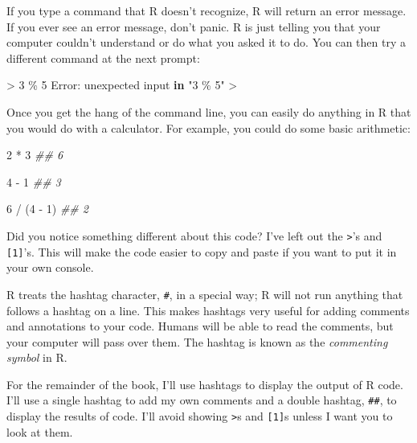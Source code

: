 \documentclass[
  letterpaper,
  DIV=11,
  numbers=noendperiod]{scrbook}
\newenvironment{Shaded}{\begin{snugshade}}{\end{snugshade}}
\newcommand{\ControlFlowTok}[1]{\textcolor[rgb]{0.00,0.23,0.31}{\textbf{#1}}}
\newcommand{\DecValTok}[1]{\textcolor[rgb]{0.68,0.00,0.00}{#1}}
\newcommand{\DocumentationTok}[1]{\textcolor[rgb]{0.37,0.37,0.37}{\textit{#1}}}
\newcommand{\NormalTok}[1]{\textcolor[rgb]{0.00,0.23,0.31}{#1}}
\newcommand{\SpecialCharTok}[1]{\textcolor[rgb]{0.37,0.37,0.37}{#1}}
\newcommand{\StringTok}[1]{\textcolor[rgb]{0.13,0.47,0.30}{#1}}
\begin{document}
If you type a command that R doesn't recognize, R will return an error
message. If you ever see an error message, don't panic. R is just
telling you that your computer couldn't understand or do what you asked
it to do. You can then try a different command at the next prompt:

\begin{Shaded}
\begin{Highlighting}[]
\SpecialCharTok{\textgreater{}} \DecValTok{3}\NormalTok{ \% }\DecValTok{5}
\NormalTok{Error}\SpecialCharTok{:}\NormalTok{ unexpected input }\ControlFlowTok{in} \StringTok{"3 \% 5"}
\SpecialCharTok{\textgreater{}}
\end{Highlighting}
\end{Shaded}

Once you get the hang of the command line, you can easily do anything in
R that you would do with a calculator. For example, you could do some
basic arithmetic:

\begin{Shaded}
\begin{Highlighting}[]
\DecValTok{2} \SpecialCharTok{*} \DecValTok{3}   
\DocumentationTok{\#\# 6}

\DecValTok{4} \SpecialCharTok{{-}} \DecValTok{1}   
\DocumentationTok{\#\# 3}

\DecValTok{6} \SpecialCharTok{/}\NormalTok{ (}\DecValTok{4} \SpecialCharTok{{-}} \DecValTok{1}\NormalTok{)   }
\DocumentationTok{\#\# 2}
\end{Highlighting}
\end{Shaded}

Did you notice something different about this code? I've left out the
\texttt{\textgreater{}}'s and \texttt{{[}1{]}}'s. This will make the
code easier to copy and paste if you want to put it in your own console.

R treats the hashtag character, \texttt{\#}, in a special way; R will
not run anything that follows a hashtag on a line. This makes hashtags
very useful for adding comments and annotations to your code. Humans
will be able to read the comments, but your computer will pass over
them. The hashtag is known as the \emph{commenting symbol} in R.

For the remainder of the book, I'll use hashtags to display the output
of R code. I'll use a single hashtag to add my own comments and a double
hashtag, \texttt{\#\#}, to display the results of code. I'll avoid
showing \texttt{\textgreater{}}s and \texttt{{[}1{]}}s unless I want you
to look at them.
\end{document}
